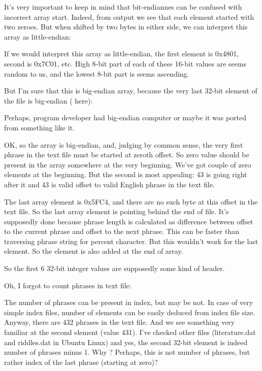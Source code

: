 It's very important to keep in mind that bit-endiannes can be confused with incorrect array start.
Indeed, from  output we see that each element started with two zeroes.
But when shifted by two bytes in either side, we can interpret this array as little-endian:



If we would interpret this array as little-endian, the first element is 0x4801, second is 0x7C01, etc.
High 8-bit part of each of these 16-bit values are seems random to us, and the lowest 8-bit part is seems ascending.

But I'm sure that this is big-endian array, because the very last 32-bit element of the file is big-endian 
( here):



Perhaps,  program developer had big-endian computer or maybe it was ported from something like it.

OK, so the array is big-endian, and, judging by common sense, the very first phrase in the text file must be started at zeroth offset. So zero value should be present in the array somewhere at the very beginning.
We've got couple of zero elements at the beginning. But the second is most appealing: 43 is going right after it and 43 is valid offset to valid English phrase in the text file.

The last array element is 0x5FC4, and there are no such byte at this offset in the text file.
So the last array element is pointing behind the end of file.
It's supposedly done because phrase length is calculated as difference between offset to the current phrase
and offset to the next phrase. 
This can be faster than traversing phrase string for percent character.
But this wouldn't work for the last element.
So the  element is also added at the end of array.

So the first 6 32-bit integer values are supposedly some kind of header.

Oh, I forgot to count phrases in text file:



The number of phrases can be present in index, but may be not.
In case of very simple index files, number of elements can be easily deduced from index file size.
Anyway, there are 432 phrases in the text file.
And we see something very familiar at the second element (value 431).
I've checked other files (literature.dat and riddles.dat in Ubuntu Linux) and yes, the second 32-bit element is indeed number of phrases minus 1.
Why ? Perhaps, this is not number of phrases, but rather index of the last phrase (starting at zero)?

